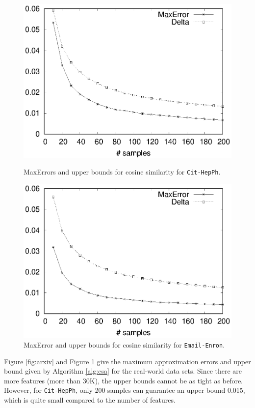 \documentclass{article}
\begin{document}
\begin{figure}[!t]
\centering
\begin{minipage}{.45\textwidth}
\centering
\includegraphics[width=.9\textwidth]{cos_arxiv_apprx_error.eps}
\caption{\textsf{MaxError}s and upper bounds for cosine similarity for \texttt{Cit-HepPh}.}
\label{fig:arxiv}
\end{minipage}
\hspace{1cm}
\begin{minipage}{.45\textwidth}
\centering
\includegraphics[width=.9\textwidth]{cos_email_apprx_error.eps}
\caption{\textsf{MaxError} and upper bounds for cosine similarity for \texttt{Email-Enron}.}
\label{fig:email}
\end{minipage}
\end{figure}

Figure \ref{fig:arxiv} and Figure \ref{fig:email} give the maximum approximation errors and upper bound given by Algorithm \ref{alg:csa} for the real-world data sets. Since there are more features (more than 30K), the upper bounds cannot be as tight as before. However, for \texttt{Cit-HepPh}, only 200 samples can guarantee an upper bound 0.015, which is quite small compared to the number of features. 
\end{document}
